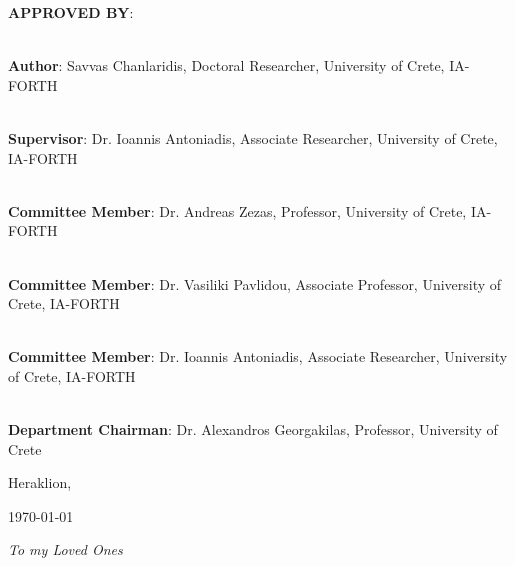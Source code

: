 \documentclass[a4paper, 10pt, twoside]{book}
\newenvironment{dedication}
  {\clearpage
   \thispagestyle{empty}
   \vspace*{\stretch{1}}
   \itshape
   \raggedleft}
  {\par
   \vspace{\stretch{3}}
   \clearpage}
\begin{document}
    \noindent \textbf{APPROVED BY}:\\
    \vspace*{1.5cm}
    
    \noindent\hrulefill \\
    \noindent\textbf{Author}: Savvas Chanlaridis, Doctoral Researcher, University of Crete, IA-FORTH \\
    \vspace*{1cm}
    
    \noindent\hrulefill \\
    \noindent\textbf{Supervisor}: Dr. Ioannis Antoniadis, Associate Researcher, University of Crete, IA-FORTH \\
    \vspace*{1cm}    
    
    \noindent\hrulefill \\
    \noindent\textbf{Committee Member}: Dr. Andreas Zezas, Professor, University of Crete, IA-FORTH \\
    \vspace*{1cm}    
    
    \noindent\hrulefill \\
    \noindent\textbf{Committee Member}: Dr. Vasiliki Pavlidou, Associate Professor, University of Crete, IA-FORTH \\
    \vspace*{1cm}    
    
    \noindent\hrulefill \\
    \noindent\textbf{Committee Member}: Dr. Ioannis Antoniadis, Associate Researcher, University of Crete, IA-FORTH \\
    \vspace*{1cm}    
    
    \noindent\hrulefill \\
    \noindent\textbf{Department Chairman}: Dr. Alexandros Georgakilas, Professor, University of Crete \\
    \vspace*{1cm}  
    
    \begin{center}
        \vspace*{\fill}
        Heraklion, \date{}{\today}
    \end{center}

    \newpage  %
    \mbox{}
    \thispagestyle{empty}

    \begin{dedication}
        To my Loved Ones
    \end{dedication}
\end{document}
